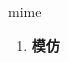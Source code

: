 
\begin{frame}
{\huge mime}
\begin{center}
\begin{enumerate}\Large
  \item \textbf{模仿}
\end{enumerate}
\end{center}
\end{frame}
